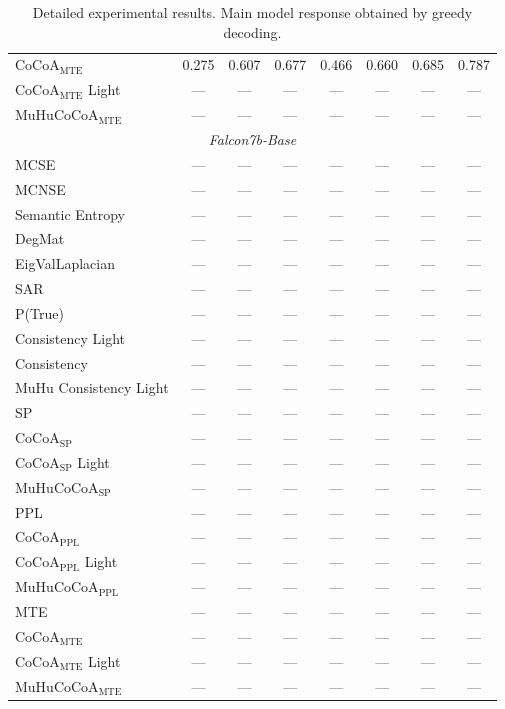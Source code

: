\documentclass[11pt]{article}
\newcommand{\method}{MuHuCoCoA}
\begin{document}
\begin{table}[htbp]
{\begin{tabular}{l ccccccc}
CoCoA$_{\mathrm{MTE}}$ & 0.275 & 0.607 & 0.677 & 0.466 & 0.660 & 0.685 & 0.787 \\
CoCoA$_{\mathrm{MTE}}$ Light & --- & --- & --- & --- & --- & --- & --- \\
\method{}$_{\mathrm{MTE}}$ & --- & --- & --- & --- & --- & --- & --- \\
\midrule
\multicolumn{8}{c}{\textit{Falcon7b-Base}} \\
\midrule
MCSE & --- & --- & --- & --- & --- & --- & --- \\
MCNSE & --- & --- & --- & --- & --- & --- & --- \\
Semantic Entropy & --- & --- & --- & --- & --- & --- & --- \\
DegMat & --- & --- & --- & --- & --- & --- & --- \\
EigValLaplacian & --- & --- & --- & --- & --- & --- & --- \\
SAR & --- & --- & --- & --- & --- & --- & --- \\
P(True) & --- & --- & --- & --- & --- & --- & --- \\
Consistency Light & --- & --- & --- & --- & --- & --- & --- \\
Consistency & --- & --- & --- & --- & --- & --- & --- \\
MuHu Consistency Light & --- & --- & --- & --- & --- & --- & --- \\
SP & --- & --- & --- & --- & --- & --- & --- \\
CoCoA$_{\mathrm{SP}}$ & --- & --- & --- & --- & --- & --- & --- \\
CoCoA$_{\mathrm{SP}}$ Light & --- & --- & --- & --- & --- & --- & --- \\
\method{}$_{\mathrm{SP}}$ & --- & --- & --- & --- & --- & --- & --- \\
PPL & --- & --- & --- & --- & --- & --- & --- \\
CoCoA$_{\mathrm{PPL}}$ & --- & --- & --- & --- & --- & --- & --- \\
CoCoA$_{\mathrm{PPL}}$ Light & --- & --- & --- & --- & --- & --- & --- \\
\method{}$_{\mathrm{PPL}}$ & --- & --- & --- & --- & --- & --- & --- \\
MTE & --- & --- & --- & --- & --- & --- & --- \\
CoCoA$_{\mathrm{MTE}}$ & --- & --- & --- & --- & --- & --- & --- \\
CoCoA$_{\mathrm{MTE}}$ Light & --- & --- & --- & --- & --- & --- & --- \\
\method{}$_{\mathrm{MTE}}$ & --- & --- & --- & --- & --- & --- & --- \\
\bottomrule
\end{tabular}%
}
\caption{Detailed experimental results. Main model response obtained by greedy decoding.}
\label{tab:cocoa_table11}
\end{table}
\end{document}
